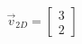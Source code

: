 \documentclass[preview]{standalone}
\begin{document}
\begin{align*}
\vec{v}_{2D} = \begin{bmatrix} 3 \\ 2 \end{bmatrix}
\end{align*}
\end{document}

